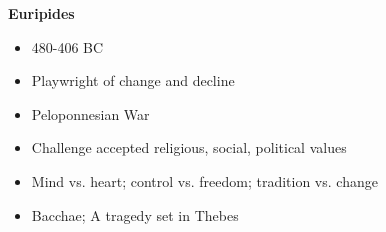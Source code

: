 \documentclass[12pt,a4paper]{report}
\begin{document}
\textbf{Euripides}
\begin{itemize}
\item 480-406 BC
\item Playwright of change and decline
\item Peloponnesian War
\item Challenge accepted religious, social, political values
\item Mind vs. heart; control vs. freedom; tradition vs. change
\item Bacchae; A tragedy set in Thebes
\end{itemize}
\end{document}
